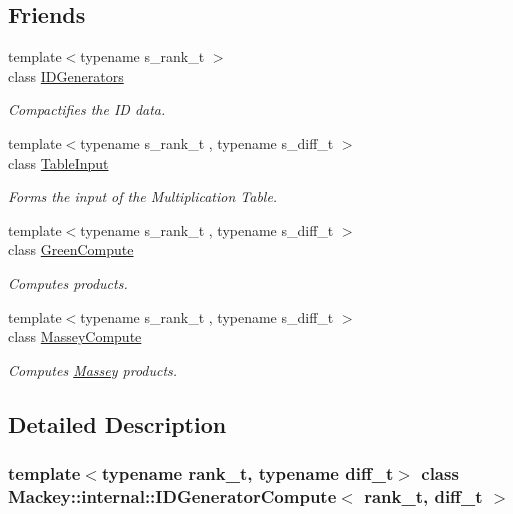 \subsection*{Friends}
\begin{DoxyCompactItemize}
\item 
{\footnotesize template$<$typename s\+\_\+rank\+\_\+t $>$ }\\class \hyperlink{classMackey_1_1internal_1_1IDGeneratorCompute_a01dc345af0bda982b61f68e8fb297e8d}{I\+D\+Generators}
\begin{DoxyCompactList}\small\item\em Compactifies the ID data. \end{DoxyCompactList}\item 
{\footnotesize template$<$typename s\+\_\+rank\+\_\+t , typename s\+\_\+diff\+\_\+t $>$ }\\class \hyperlink{classMackey_1_1internal_1_1IDGeneratorCompute_aa9b93b7c7f692b237593457fa7dc78a8}{Table\+Input}
\begin{DoxyCompactList}\small\item\em Forms the input of the Multiplication Table. \end{DoxyCompactList}\item 
{\footnotesize template$<$typename s\+\_\+rank\+\_\+t , typename s\+\_\+diff\+\_\+t $>$ }\\class \hyperlink{classMackey_1_1internal_1_1IDGeneratorCompute_a85de7c4aeeee34981e2020c2f9ddd3e2}{Green\+Compute}
\begin{DoxyCompactList}\small\item\em Computes products. \end{DoxyCompactList}\item 
{\footnotesize template$<$typename s\+\_\+rank\+\_\+t , typename s\+\_\+diff\+\_\+t $>$ }\\class \hyperlink{classMackey_1_1internal_1_1IDGeneratorCompute_af259bfb9b4dced17104ac8fbb697355c}{Massey\+Compute}
\begin{DoxyCompactList}\small\item\em Computes \hyperlink{classMackey_1_1Massey}{Massey} products. \end{DoxyCompactList}\end{DoxyCompactItemize}


\subsection{Detailed Description}
\subsubsection*{template$<$typename rank\+\_\+t, typename diff\+\_\+t$>$\newline
class Mackey\+::internal\+::\+I\+D\+Generator\+Compute$<$ rank\+\_\+t, diff\+\_\+t $>$}

